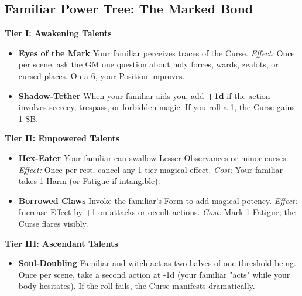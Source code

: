 \documentclass[11pt]{book}
\begin{document}
\subsection*{Familiar Power Tree: The Marked Bond}

\begin{tcolorbox}[colback=shadowpurple!5,colframe=shadowpurple!80!black,
title={\textbf{The Marked Bond} --- Talents for Cursed Familiars}]

\textbf{Tier I: Awakening Talents}

\begin{itemize}[noitemsep,leftmargin=1.5em]
    \item \textbf{Eyes of the Mark}  
    Your familiar perceives traces of the Curse.  
    \emph{Effect:} Once per scene, ask the GM one question about  
    holy forces, wards, zealots, or cursed places.  
    On a 6, your Position improves.

    \item \textbf{Shadow-Tether}  
    When your familiar aids you, add \textbf{+1d} if the action involves  
    secrecy, trespass, or forbidden magic.  
    If you roll a 1, the Curse gains 1 SB.
\end{itemize}

\vspace{0.5em}

\textbf{Tier II: Empowered Talents}

\begin{itemize}[noitemsep,leftmargin=1.5em]
    \item \textbf{Hex-Eater}  
    Your familiar can swallow Lesser Observances or minor curses.  
    \emph{Effect:} Once per rest, cancel any 1-tier magical effect.  
    \emph{Cost:} Your familiar takes 1 Harm (or Fatigue if intangible).

    \item \textbf{Borrowed Claws}  
    Invoke the familiar's Form to add magical potency.  
    \emph{Effect:} Increase Effect by +1 on attacks or occult actions.  
    \emph{Cost:} Mark 1 Fatigue; the Curse flares visibly.
\end{itemize}

\vspace{0.5em}

\textbf{Tier III: Ascendant Talents}

\begin{itemize}[noitemsep,leftmargin=1.5em]
    \item \textbf{Soul-Doubling}  
    Familiar and witch act as two halves of one threshold-being.  
    Once per scene, take a second action at -1d  
    (your familiar "acts" while your body hesitates).  
    If the roll fails, the Curse manifests dramatically.


\end{itemize}
\end{tcolorbox}
\end{document}
